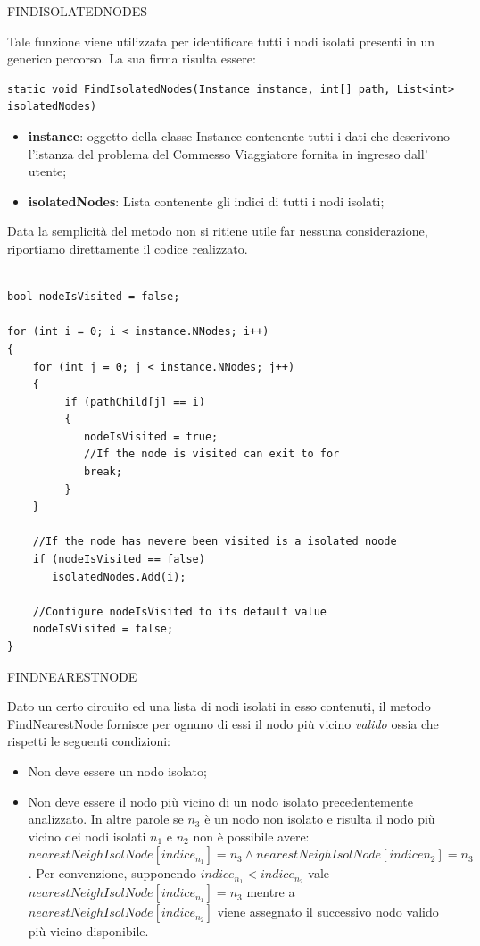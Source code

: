\documentclass[11pt]{article}
\begin{document}
\vspace{2\baselineskip}
FINDISOLATEDNODES
\vspace{2\baselineskip}

Tale funzione viene utilizzata per identificare tutti i nodi isolati presenti in un generico percorso.
La sua firma risulta essere:

\begin{lstlisting}
static void FindIsolatedNodes(Instance instance, int[] path, List<int> isolatedNodes)
\end{lstlisting}

\begin{itemize}
    \item \textbf{instance}: oggetto della classe Instance contenente tutti i dati che descrivono l'istanza del problema del Commesso Viaggiatore fornita in ingresso dall' utente;
    \item \textbf{isolatedNodes}: Lista contenente gli indici di tutti i nodi isolati;
\end{itemize}

Data la semplicità del metodo non si ritiene utile far nessuna considerazione, riportiamo direttamente il codice realizzato.

\begin{lstlisting}

bool nodeIsVisited = false;

for (int i = 0; i < instance.NNodes; i++)
{
    for (int j = 0; j < instance.NNodes; j++)
    {
         if (pathChild[j] == i)
         {
            nodeIsVisited = true;
            //If the node is visited can exit to for
            break;
         }
    }

    //If the node has nevere been visited is a isolated noode
    if (nodeIsVisited == false)
       isolatedNodes.Add(i);

    //Configure nodeIsVisited to its default value
    nodeIsVisited = false;
}

\end{lstlisting}

\vspace{2\baselineskip}
FINDNEARESTNODE
\vspace{2\baselineskip}

Dato un certo circuito ed una lista di nodi isolati in esso contenuti, il metodo FindNearestNode fornisce per ognuno di essi il nodo più vicino \textit{valido} ossia che rispetti le seguenti condizioni:

\begin{itemize}
    \item  Non deve essere un nodo isolato;
    \item  Non deve essere il nodo più vicino di un nodo isolato precedentemente analizzato. In altre parole se $n_3$ è un nodo non isolato e risulta il nodo più vicino dei nodi isolati $n_1$ e $n_2$ non è possibile avere: $nearestNeighIsolNode[indice_{n_1}] = n_3 \wedge nearestNeighIsolNode[indice{n_2}] = n_3$. Per convenzione, supponendo $indice_{n_1} < indice_{n_2}$ vale $nearestNeighIsolNode[indice_{n_1}] = n_3$ mentre a $nearestNeighIsolNode[indice_{n_2}]$ viene assegnato il successivo nodo valido più vicino disponibile.
\end{itemize}
\end{document}
